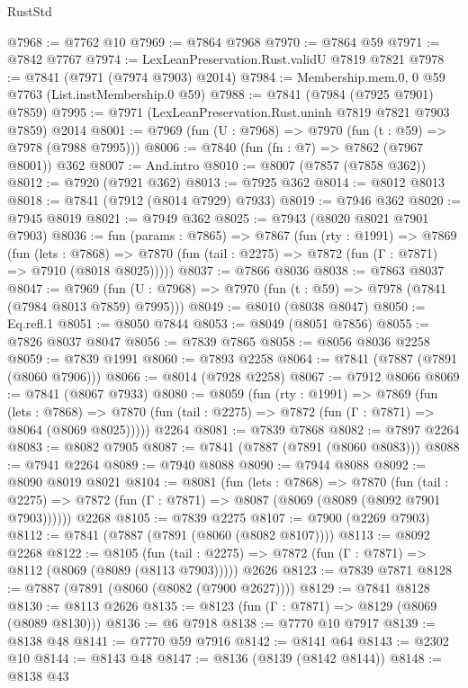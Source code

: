 \begin{lexlean}{RustStd}
\begin{coremodule}
@7968 := @7762 @10
@7969 := @7864 @7968
@7970 := @7864 @59
@7971 := @7842 @7767
@7974 := LexLeanPreservation.Rust.validU @7819 @7821
@7978 := @7841 (@7971 (@7974 @7903) @2014)
@7984 := Membership.mem.{0, 0} @59 @7763 (List.instMembership.{0} @59)
@7988 := @7841 (@7984 (@7925 @7901) @7859)
@7995 := @7971 (LexLeanPreservation.Rust.uninh @7819 @7821 @7903 @7859) @2014
@8001 := @7969 (fun (U : @7968) => @7970 (fun (t : @59) => @7978 (@7988 @7995)))
@8006 := @7840 (fun (fn : @7) => @7862 (@7967 @8001)) @362
@8007 := And.intro
@8010 := @8007 (@7857 (@7858 @362))
@8012 := @7920 (@7921 @362)
@8013 := @7925 @362
@8014 := @8012 @8013
@8018 := @7841 (@7912 (@8014 @7929) @7933)
@8019 := @7946 @362
@8020 := @7945 @8019
@8021 := @7949 @362
@8025 := @7943 (@8020 @8021 @7901 @7903)
@8036 := fun (params : @7865) =>
  @7867
    (fun (rty : @1991) =>
    @7869
      (fun (lets : @7868) =>
      @7870 (fun (tail : @2275) => @7872 (fun (Γ : @7871) => @7910 (@8018 @8025)))))
@8037 := @7866 @8036
@8038 := @7863 @8037
@8047 := @7969 (fun (U : @7968) => @7970 (fun (t : @59) => @7978 (@7841 (@7984 @8013 @7859) @7995)))
@8049 := @8010 (@8038 @8047)
@8050 := Eq.refl.{1}
@8051 := @8050 @7844
@8053 := @8049 (@8051 @7856)
@8055 := @7826 @8037 @8047
@8056 := @7839 @7865
@8058 := @8056 @8036 @2258
@8059 := @7839 @1991
@8060 := @7893 @2258
@8064 := @7841 (@7887 (@7891 (@8060 @7906)))
@8066 := @8014 (@7928 @2258)
@8067 := @7912 @8066
@8069 := @7841 (@8067 @7933)
@8080 := @8059
    (fun (rty : @1991) =>
    @7869
      (fun (lets : @7868) =>
      @7870 (fun (tail : @2275) => @7872 (fun (Γ : @7871) => @8064 (@8069 @8025)))))
    @2264
@8081 := @7839 @7868
@8082 := @7897 @2264
@8083 := @8082 @7905
@8087 := @7841 (@7887 (@7891 (@8060 @8083)))
@8088 := @7941 @2264
@8089 := @7940 @8088
@8090 := @7944 @8088
@8092 := @8090 @8019 @8021
@8104 := @8081
    (fun (lets : @7868) =>
    @7870
      (fun (tail : @2275) => @7872 (fun (Γ : @7871) => @8087 (@8069 (@8089 (@8092 @7901 @7903))))))
    @2268
@8105 := @7839 @2275
@8107 := @7900 (@2269 @7903)
@8112 := @7841 (@7887 (@7891 (@8060 (@8082 @8107))))
@8113 := @8092 @2268
@8122 := @8105
    (fun (tail : @2275) => @7872 (fun (Γ : @7871) => @8112 (@8069 (@8089 (@8113 @7903)))))
    @2626
@8123 := @7839 @7871
@8128 := @7887 (@7891 (@8060 (@8082 (@7900 @2627))))
@8129 := @7841 @8128
@8130 := @8113 @2626
@8135 := @8123 (fun (Γ : @7871) => @8129 (@8069 (@8089 @8130)))
@8136 := @6 @7918
@8138 := @7770 @10 @7917
@8139 := @8138 @48
@8141 := @7770 @59 @7916
@8142 := @8141 @64
@8143 := @2302 @10
@8144 := @8143 @48
@8147 := @8136 (@8139 (@8142 @8144))
@8148 := @8138 @43

\end{coremodule}
\end{lexlean}
